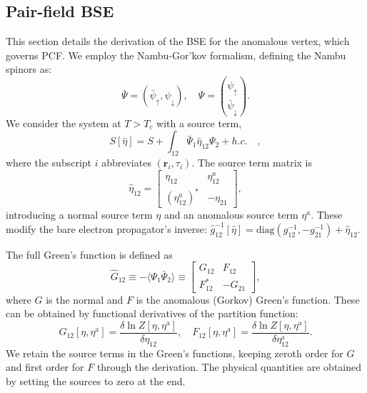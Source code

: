 \documentclass[%
 reprint,
superscriptaddress,
 amsmath,amssymb,
 aps,
prx,
]{revtex4-2}
\newcommand{\br}{\mathbf{r}}
\newcommand{\txa}{\text{a}}
\newcommand{\nambu}[1]{\hat{#1}}
\begin{document}
\begin{appendices}
\section{Pair-field BSE}
\label{sec:pcf_general_derivation}
This section details the derivation of the BSE for the anomalous vertex, which governs PCF. We employ the Nambu-Gor'kov formalism, defining the Nambu spinors as:
\begin{equation}
    \bar{\Psi}=\left(\bar{\psi}_{\uparrow},{\psi}_{\downarrow}\right), \quad \Psi=\binom{\psi_{\uparrow}}{\bar{\psi}_{\downarrow}}.
\end{equation}
We consider the system at $T>T_c$ with a source term,
\begin{equation}
    S[\nambu{\eta}] = S + \int_{12} \bar{\Psi}_1 \nambu{\eta}_{12} \Psi_2 + h.c.\quad,
    \label{eq:source_action}
\end{equation}
where the subscript $i$ abbreviates $(\br_i,\tau_i)$.
The source term matrix is
\begin{equation}
    \nambu{\eta}_{12} = \begin{bmatrix}
        \eta_{12} & \eta^a_{12} \\
        (\eta^a_{12})^* & -\eta_{21}
        \end{bmatrix},
\end{equation}
introducing a normal source term $\eta$ and an anomalous source term $\eta^a$.
These modify the bare electron propagator's inverse: $\nambu{g}^{-1}_{12}[\nambu{\eta}]=\text{diag}(g^{-1}_{12},-g^{-1}_{21})+\nambu{\eta}_{12}$.

The full Green's function is defined as
\begin{equation}
\nambu{G}_{12}\equiv -\langle\Psi_1\bar{\Psi}_2\rangle \equiv \begin{bmatrix}
    G_{12} & F_{12} \\
    F^*_{12} & -G_{21}
    \end{bmatrix},
\end{equation}
where $G$ is the normal and $F$ is the anomalous (Gorkov) Green's function.
These can be obtained by functional derivatives of the partition function:
\begin{equation}
    G_{12}[\eta,\eta^\txa] = \frac{\delta \ln Z[\eta,\eta^\txa]}{\delta \eta_{12}}, \quad F_{12}[\eta,\eta^\txa] =\frac{\delta \ln Z[\eta,\eta^\txa]}{\delta \eta^\txa_{12}}.
\end{equation}
We retain the source terms in the Green's functions, keeping zeroth order for $G$ and first order for $F$ through the derivation. The physical quantities are obtained by setting the sources to zero at the end.


\end{appendices}
\end{document}
